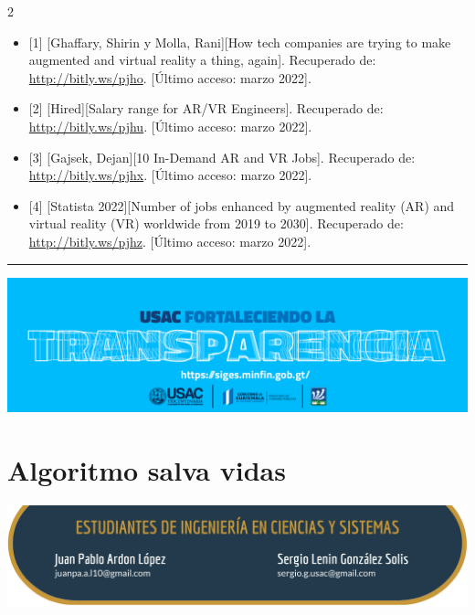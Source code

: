 \documentclass[12pt,spanish,Letterpaper,openany]{book}
\newcommand{\HRule}{\begin{center}\rule{0.5\linewidth}{0.2mm}\end{center}}
\begin{document}
\begin {multicols}{2}
\begin{itemize}
\item
  {[}1{]} {[}Ghaffary, Shirin y Molla, Rani{]}{[}How tech companies are trying to make augmented and virtual reality a thing, again{]}. Recuperado de: \url{http://bitly.ws/pjho}. {[}Último acceso: marzo 2022{]}.
\item
  {[}2{]} {[}Hired{]}{[}Salary range for AR/VR Engineers{]}. Recuperado de: \url{http://bitly.ws/pjhu}. {[}Último acceso: marzo 2022{]}.
\item
  {[}3{]} {[}Gajsek, Dejan{]}{[}10 In-Demand AR and VR Jobs{]}. Recuperado de: \url{http://bitly.ws/pjhx}. {[}Último acceso: marzo 2022{]}.
\item
  {[}4{]} {[}Statista 2022{]}{[}Number of jobs enhanced by augmented reality (AR) and virtual reality (VR) worldwide from 2019 to 2030{]}. Recuperado de: \url{http://bitly.ws/pjhz}. {[}Último acceso: marzo 2022{]}.
\end{itemize}

\end {multicols}
\medskip
\HRule
\medskip

\begin{center}\includegraphics[width=1\linewidth]{images/publicidad2} \end{center}

\hypertarget{pareja51}{%
\chapter{Algoritmo salva vidas}\label{pareja51}}

\begin{center}\includegraphics[width=1\linewidth]{images/pareja51_image1} \end{center}
\end{document}
